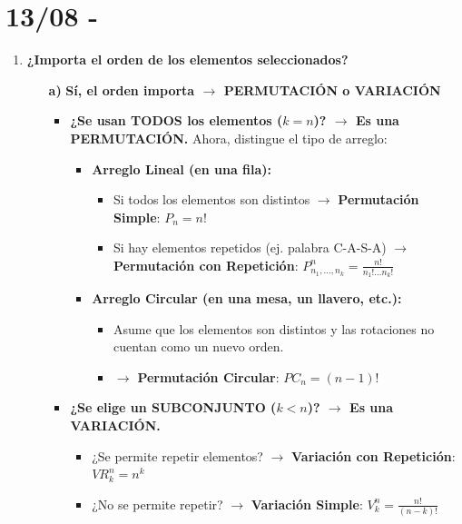 \documentclass[12pt, letterpaper]{article}
\begin{document}
\section{13/08 - }
\begin{enumerate}[label=\bfseries, wide]
    \item \textbf{¿Importa el orden de los elementos seleccionados?}
    \begin{itemize}
        \item[\bfseries a)] \textbf{Sí, el orden importa $\rightarrow$ PERMUTACIÓN o VARIACIÓN}
            \begin{itemize}
                \item \textbf{¿Se usan TODOS los elementos ($k=n$)? $\rightarrow$ Es una PERMUTACIÓN.}
                \noindent Ahora, distingue el tipo de arreglo:
                    \begin{itemize}
                        \item \textbf{Arreglo Lineal (en una fila):}
                            \begin{itemize}
                                \item Si todos los elementos son distintos $\rightarrow$ \textbf{Permutación Simple}: 
                                      $ P_n = n! $
                                \item Si hay elementos repetidos (ej. palabra C-A-S-A) $\rightarrow$ \textbf{Permutación con Repetición}: 
                                      $ P_{n_1, \dots, n_k}^n = \frac{n!}{n_1! \dots n_k!} $
                            \end{itemize}
                        
                        \item \textbf{Arreglo Circular (en una mesa, un llavero, etc.):}
                            \begin{itemize}
                                \item Asume que los elementos son distintos y las rotaciones no cuentan como un nuevo orden.
                                \item $\rightarrow$ \textbf{Permutación Circular}: $ PC_n = (n-1)! $
                            \end{itemize}
                    \end{itemize}

                \item \textbf{¿Se elige un SUBCONJUNTO ($k<n$)? $\rightarrow$ Es una VARIACIÓN.}
                    \begin{itemize}
                        \item ¿Se permite repetir elementos? $\rightarrow$ \textbf{Variación con Repetición}: $ VR_k^n = n^k $
                        \item ¿No se permite repetir? $\rightarrow$ \textbf{Variación Simple}: $ V_k^n = \frac{n!}{(n-k)!} $
                    \end{itemize}
            \end{itemize}
        

\end{itemize}
\end{enumerate}
\end{document}
